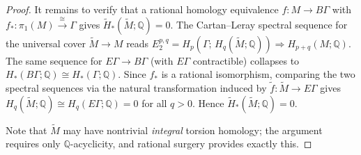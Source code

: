 \begin{proof}
It remains to verify that a rational homology equivalence
$f\colon M\to B\Gamma$ with $f_*\colon\pi_1(M)\xrightarrow{\cong}\Gamma$
gives $\widetilde H_*(\widetilde M;\mathbb Q)=0$.
The Cartan--Leray spectral sequence for the universal cover
$\widetilde M\to M$ reads
$E_2^{p,q}=H_p(\Gamma;\,H_q(\widetilde M;\mathbb Q))
 \Rightarrow H_{p+q}(M;\mathbb Q)$.
The same sequence for $E\Gamma\to B\Gamma$ (with $E\Gamma$ contractible)
collapses to
$H_*(B\Gamma;\mathbb Q)\cong H_*(\Gamma;\mathbb Q)$.
Since $f_*$ is a rational isomorphism, comparing the two spectral sequences
via the natural transformation induced by $\widetilde f\colon\widetilde M\to E\Gamma$
gives $H_q(\widetilde M;\mathbb Q)\cong H_q(E\Gamma;\mathbb Q)=0$ for all $q>0$.
Hence $\widetilde H_*(\widetilde M;\mathbb Q)=0$.

Note that $\widetilde M$ may have nontrivial \emph{integral} torsion homology;
the argument requires only $\mathbb Q$-acyclicity, and rational surgery
provides exactly this.
\end{proof}

